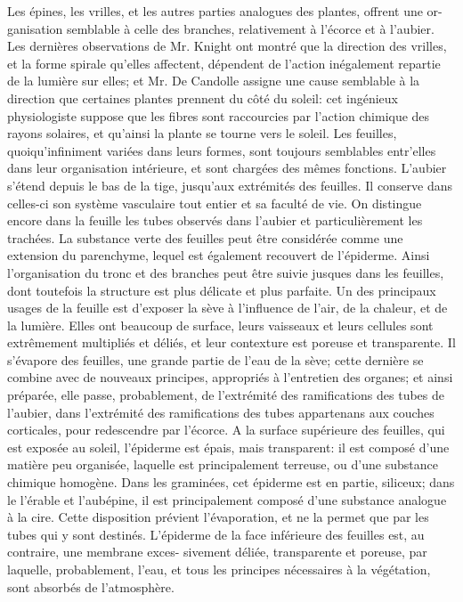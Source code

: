 Les épines, les vrilles, et les autres parties analogues des plantes, offrent une or-\setcounter{page}{382} ganisation semblable à celle des branches, relativement à l'écorce et à l'aubier. Les dernières observations de Mr. Knight ont montré que la direction des vrilles, et la forme spirale qu'elles affectent, dépendent de l'action inégalement repartie de la lumière sur elles; et Mr. De Candolle assigne une cause semblable à la direction que certaines plantes prennent du côté du soleil: cet ingénieux physiologiste suppose que les fibres sont raccourcies par l'action chimique des rayons solaires, et qu'ainsi la plante se tourne vers le soleil.
Les feuilles, quoiqu'infiniment variées dans leurs formes, sont toujours semblables entr'elles dans leur organisation intérieure, et sont chargées des mêmes fonctions.
L'aubier s'étend depuis le bas de la tige, jusqu'aux extrémités des feuilles. Il conserve dans celles-ci son système vasculaire tout entier et sa faculté de vie. On distingue encore dans la feuille les tubes observés dans l'aubier et particulièrement les trachées.
La substance verte des feuilles peut être considérée comme une extension du parenchyme, lequel est également recouvert de l'épiderme. Ainsi l'organisation du tronc et des branches peut être suivie jusques dans les feuilles, dont toutefois la structure est plus délicate et plus parfaite.\setcounter{page}{383} Un des principaux usages de la feuille est d’exposer la sève à l’influence de l’air, de la chaleur, et de la lumière. Elles ont beaucoup de surface, leurs vaisseaux et leurs cellules sont extrêmement multipliés et déliés, et leur contexture est poreuse et transparente. Il s’évapore des feuilles, une grande partie de l’eau de la sève; cette dernière se combine avec de nouveaux principes, appropriés à l’entretien des organes; et ainsi préparée, elle passe, probablement, de l’extrémité des ramifications des tubes de l’aubier, dans l’extrémité des ramifications des tubes appartenans aux couches corticales, pour redescendre par l’écorce.
A la surface supérieure des feuilles, qui est exposée au soleil, l’épiderme est épais, mais transparent: il est composé d’une matière peu organisée, laquelle est principalement terreuse, ou d’une substance chimique homogène. Dans les graminées, cet épiderme est en partie, siliceux; dans le l’érable et l’aubépine, il est principalement composé d’une substance analogue à la cire. Cette disposition prévient l’évaporation, et ne la permet que par les tubes qui y sont destinés.
L’épiderme de la face inférieure des feuilles est, au contraire, une membrane exces-\setcounter{page}{384} sivement déliée, transparente et poreuse, par laquelle, probablement, l'eau, et tous les principes nécessaires à la végétation, sont absorbés de l'atmosphère.
